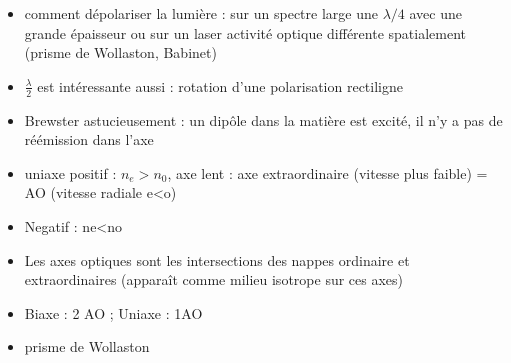 \begin{remarques}
\begin{itemize}
\item comment dépolariser la lumière : sur un spectre large une $\lambda/4$ avec une grande épaisseur ou sur un laser activité optique différente spatialement (prisme de Wollaston, Babinet)
\item $\frac{\lambda}{2}$ est intéressante aussi : rotation d'une polarisation rectiligne 
\item Brewster astucieusement : un dipôle dans la matière est excité, il n'y a pas de réémission dans l'axe
\item uniaxe positif : $n_e>n_0$, axe lent : axe extraordinaire (vitesse plus faible) = AO (vitesse radiale e<o)
\item Negatif : ne<no
\item Les axes optiques sont les intersections des nappes ordinaire et extraordinaires (apparaît comme milieu isotrope sur ces axes)
\item Biaxe : 2 AO ; Uniaxe : 1AO
\item prisme de Wollaston
\end{itemize} \end{remarques}